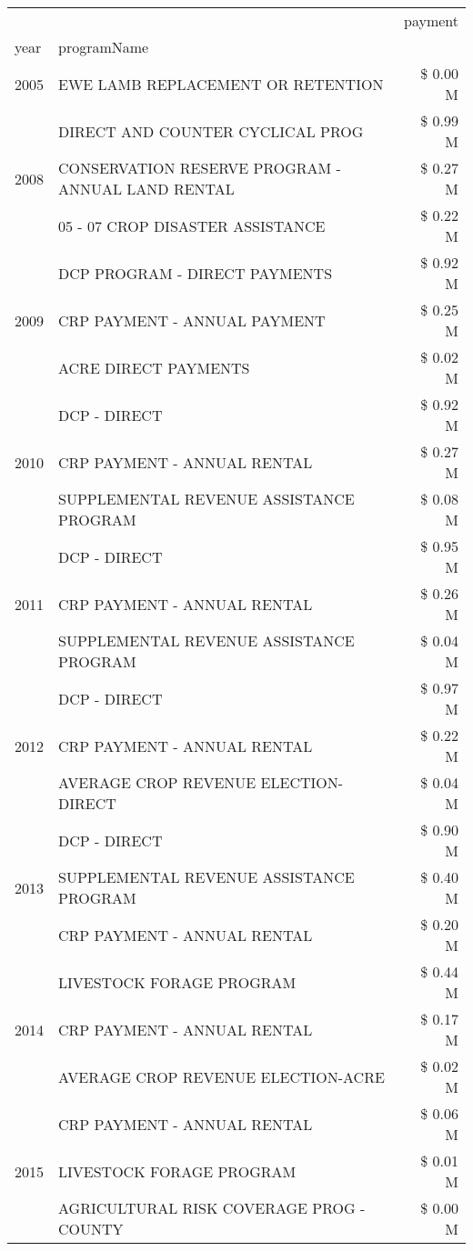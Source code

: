 \begin{tabular}{llr}
\toprule
 &  & payment \\
year & programName &  \\
\midrule
2005 & EWE LAMB REPLACEMENT OR RETENTION & \$ 0.00 M \\
\cline{1-3}
\multirow[t]{3}{*}{2008} & DIRECT AND COUNTER CYCLICAL PROG & \$ 0.99 M \\
 & CONSERVATION RESERVE PROGRAM - ANNUAL LAND RENTAL & \$ 0.27 M \\
 & 05 - 07 CROP DISASTER ASSISTANCE & \$ 0.22 M \\
\cline{1-3}
\multirow[t]{3}{*}{2009} & DCP PROGRAM - DIRECT PAYMENTS & \$ 0.92 M \\
 & CRP PAYMENT - ANNUAL PAYMENT & \$ 0.25 M \\
 & ACRE DIRECT PAYMENTS & \$ 0.02 M \\
\cline{1-3}
\multirow[t]{3}{*}{2010} & DCP - DIRECT & \$ 0.92 M \\
 & CRP PAYMENT - ANNUAL RENTAL & \$ 0.27 M \\
 & SUPPLEMENTAL REVENUE ASSISTANCE PROGRAM & \$ 0.08 M \\
\cline{1-3}
\multirow[t]{3}{*}{2011} & DCP - DIRECT & \$ 0.95 M \\
 & CRP PAYMENT - ANNUAL RENTAL & \$ 0.26 M \\
 & SUPPLEMENTAL REVENUE ASSISTANCE PROGRAM & \$ 0.04 M \\
\cline{1-3}
\multirow[t]{3}{*}{2012} & DCP - DIRECT & \$ 0.97 M \\
 & CRP PAYMENT - ANNUAL RENTAL & \$ 0.22 M \\
 & AVERAGE CROP REVENUE ELECTION-DIRECT & \$ 0.04 M \\
\cline{1-3}
\multirow[t]{3}{*}{2013} & DCP - DIRECT & \$ 0.90 M \\
 & SUPPLEMENTAL REVENUE ASSISTANCE PROGRAM & \$ 0.40 M \\
 & CRP PAYMENT - ANNUAL RENTAL & \$ 0.20 M \\
\cline{1-3}
\multirow[t]{3}{*}{2014} & LIVESTOCK FORAGE PROGRAM & \$ 0.44 M \\
 & CRP PAYMENT - ANNUAL RENTAL & \$ 0.17 M \\
 & AVERAGE CROP REVENUE ELECTION-ACRE & \$ 0.02 M \\
\cline{1-3}
\multirow[t]{3}{*}{2015} & CRP PAYMENT - ANNUAL RENTAL & \$ 0.06 M \\
 & LIVESTOCK FORAGE PROGRAM & \$ 0.01 M \\
 & AGRICULTURAL RISK COVERAGE PROG - COUNTY & \$ 0.00 M \\

\end{tabular}
